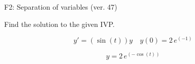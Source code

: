 \begin{exercise}
  \begin{exerciseTitle}F2: Separation of variables (ver. 47)\end{exerciseTitle}
  \begin{exerciseStatement}
    
Find the solution to the given IVP.

    
\[y'=( \sin\left(t\right) )y\hspace{1em} y(0)= 2 \, e^{\left(-1\right)}\]

  \end{exerciseStatement}
  \begin{exerciseAnswer}
    
\[y= 2 \, e^{\left(-\cos\left(t\right)\right)}\]

  \end{exerciseAnswer}
\end{exercise}